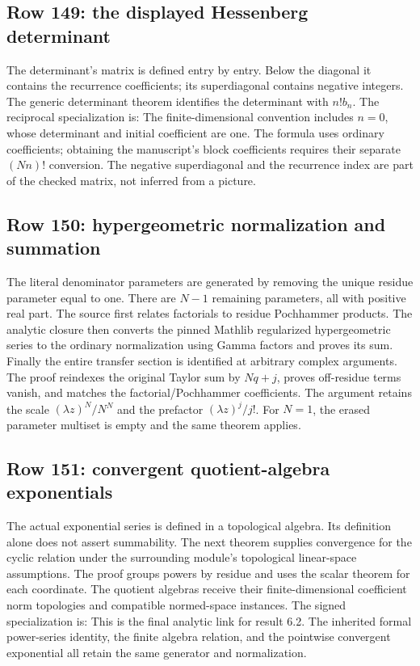 \subsection{Row 149: the displayed Hessenberg determinant}
The determinant's matrix is defined entry by entry. Below the diagonal it contains the recurrence coefficients; its superdiagonal contains negative integers.
The generic determinant theorem identifies the determinant with $n!b_n$. The reciprocal specialization is:
The finite-dimensional convention includes $n=0$, whose determinant and initial coefficient are one. The formula uses ordinary coefficients; obtaining the manuscript's block coefficients requires their separate $(Nn)!$ conversion. The negative superdiagonal and the recurrence index are part of the checked matrix, not inferred from a picture.

\subsection{Row 150: hypergeometric normalization and summation}
The literal denominator parameters are generated by removing the unique residue parameter equal to one.
There are $N-1$ remaining parameters, all with positive real part. The source first relates factorials to residue Pochhammer products. The analytic closure then converts the pinned Mathlib regularized hypergeometric series to the ordinary normalization using Gamma factors and proves its sum.
Finally the entire transfer section is identified at arbitrary complex arguments.
The proof reindexes the original Taylor sum by $Nq+j$, proves off-residue terms vanish, and matches the factorial/Pochhammer coefficients. The argument retains the scale $(\lambda z)^N/N^N$ and the prefactor $(\lambda z)^j/j!$. For $N=1$, the erased parameter multiset is empty and the same theorem applies.

\subsection{Row 151: convergent quotient-algebra exponentials}
The actual exponential series is defined in a topological algebra.
Its definition alone does not assert summability. The next theorem supplies convergence for the cyclic relation under the surrounding module's topological linear-space assumptions.
The proof groups powers by residue and uses the scalar  theorem for each coordinate. The quotient algebras receive their finite-dimensional coefficient norm topologies and compatible normed-space instances. The signed specialization is:
This is the final analytic link for result 6.2. The inherited formal power-series identity, the finite algebra relation, and the pointwise convergent exponential all retain the same generator and normalization.
